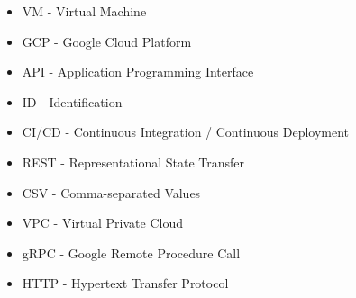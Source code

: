 \begin{itemize}
    \item VM - Virtual Machine
    \item GCP - Google Cloud Platform
    \item API - Application Programming Interface 
    \item ID - Identification
    \item CI/CD - Continuous Integration / Continuous Deployment
    \item REST - Representational State Transfer
    \item CSV - Comma-separated Values
    \item VPC - Virtual Private Cloud
    \item gRPC - Google Remote Procedure Call
    \item HTTP - Hypertext Transfer Protocol
\end{itemize}
